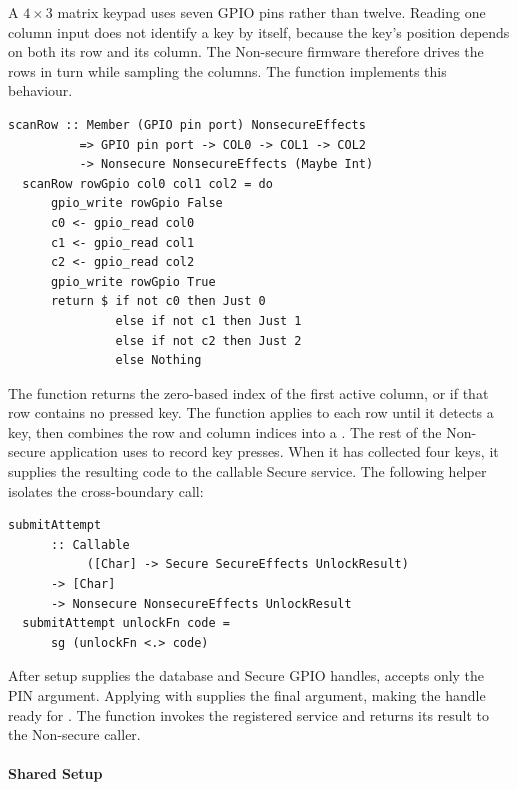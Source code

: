 \documentclass[sigconf]{acmart}
\begin{document}
A \(4 \times 3\) matrix keypad uses seven GPIO pins rather than twelve.
Reading one column input does not identify a key by itself, because the key's position depends on both its row and its column.
The Non-secure firmware therefore drives the rows in turn while sampling the columns.
The function  implements this behaviour.

\begin{lstlisting}[style=haskell]
  scanRow :: Member (GPIO pin port) NonsecureEffects
          => GPIO pin port -> COL0 -> COL1 -> COL2
          -> Nonsecure NonsecureEffects (Maybe Int)
  scanRow rowGpio col0 col1 col2 = do
      gpio_write rowGpio False
      c0 <- gpio_read col0
      c1 <- gpio_read col1
      c2 <- gpio_read col2
      gpio_write rowGpio True
      return $ if not c0 then Just 0
               else if not c1 then Just 1
               else if not c2 then Just 2
               else Nothing
\end{lstlisting}

The  function returns the zero-based index of the first active column, or  if that row contains no pressed key.
The  function applies  to each row until it detects a key, then combines the row and column indices into a .
The rest of the Non-secure application uses  to record key presses.
When it has collected four keys, it supplies the resulting code to the callable Secure service.
The following helper isolates the cross-boundary call:

\begin{lstlisting}[style=haskell]
  submitAttempt
      :: Callable
           ([Char] -> Secure SecureEffects UnlockResult)
      -> [Char]
      -> Nonsecure NonsecureEffects UnlockResult
  submitAttempt unlockFn code =
      sg (unlockFn <.> code)
\end{lstlisting}

After setup supplies the database and Secure GPIO handles,  accepts only the PIN argument.
Applying  with  supplies the final argument, making the handle ready for .
The function  invokes the registered service and returns its result to the Non-secure caller.

\paragraph{Shared Setup}
\end{document}
